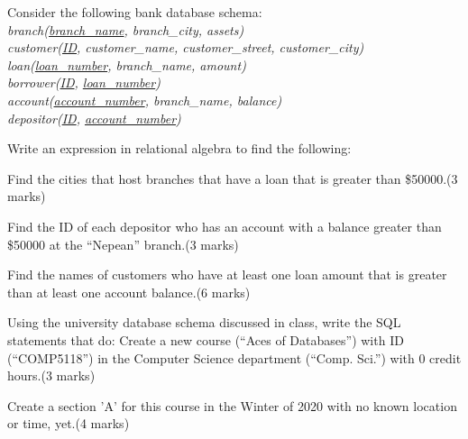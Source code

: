 \documentclass[a4 paper]{article}
\begin{document}
\vspace{3em}

Consider the following bank database schema:\\
\emph{branch(\underline{branch\_name}, branch\_city, assets)}\\
\emph{customer(\underline{ID}, customer\_name, customer\_street, customer\_city)}\\
\emph{loan(\underline{loan\_number}, branch\_name, amount)}\\
\emph{borrower(\underline{ID}, \underline{loan\_number})}\\
\emph{account(\underline{account\_number}, branch\_name, balance)}\\
\emph{depositor(\underline{ID}, \underline{account\_number})}

\noindent Write an expression in relational algebra to find the following:

 Find the cities that host branches that have a loan that is greater than \$50000.\indent (3 marks)\\

\vspace{3em}


 Find the ID of each depositor who has an account with a balance greater than \$50000 at the ``Nepean'' branch.\indent (3 marks)\\

\vspace{3em}

 Find the names of customers who have at least one loan amount that is greater than at least one account balance.\indent (6 marks)\\

\vspace{3em}



Using the university database schema discussed in class, write the SQL statements that do:
 Create a new course (``Aces of Databases'') with ID (``COMP5118'') in the Computer Science department (``Comp. Sci.'') with 0 credit hours.\indent (3 marks)\\

\vspace{10em}

 Create a section 'A' for this course in the Winter of 2020 with no known location or time, yet.\indent (4 marks)\\
\end{document}
